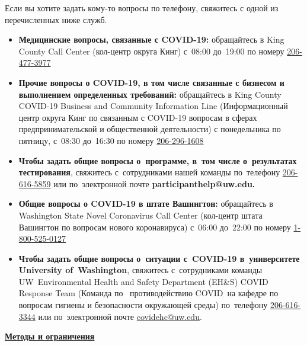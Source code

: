 \documentclass[10pt]{article}
\begin{document}
Если вы хотите задать кому-то вопросы по телефону, свяжитесь с одной из
перечисленных ниже служб.

\begin{itemize}

\item

  \textbf{Медицинские вопросы, связанные с COVID-19:} обращайтесь в King County
  Call Center (кол-центр округа Кинг) с 08:00 до 19:00 по номеру
  \href{tel:+1-206-477-3977}{206-477-3977}

\item

  \textbf{Прочие вопросы о COVID-19, в том числе связанные с бизнесом и
  выполнением определенных требований:} обращайтесь в King County COVID-19
  Business and Community Information Line (Информационный центр округа Кинг по
  связанным с COVID-19 вопросам в сферах предпринимательской и общественной
  деятельности) с понедельника по пятницу, с 08:30 до 16:30 по номеру
  \href{tel:+1-206-296-1608}{206-296-1608}

\item

  \textbf{Чтобы задать общие вопросы о программе, в том числе о результатах
  тестирования}, свяжитесь с сотрудниками нашей команды по телефону
  \href{tel:+1-206-616-5859}{206-616-5859} или по электронной почте
  \textbf{participanthelp@uw.edu.}

\item

  \textbf{Общие вопросы о COVID-19 в штате Вашингтон:} обращайтесь в Washington
  State Novel Coronavirus Call Center (кол-центр штата Вашингтон по вопросам
  нового коронавируса) с 06:00 до 22:00 по номеру \href{tel:+1-800-525-0127}{1-800-525-0127}

\item
  \textbf{Чтобы задать общие вопросы о ситуации с COVID-19 в университете
  University of Washington}, свяжитесь с сотрудниками команды UW Environmental
  Health and Safety Department (EH\&S) COVID Response Team (Команда по 
  противодействию COVID на кафедре по вопросам гигиены и безопасности окружающей
  среды) по телефону \href{tel:+1-206-616-3344}{206-616-3344} или по электронной почте
  \href{mailto:covidehc@uw.edu}{covidehc@uw.edu}.

\end{itemize}

\bigskip

\large \underline{\textbf{Методы и ограничения}}
\end{document}
